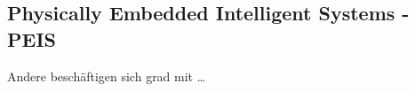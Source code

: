 \subsection{Physically Embedded Intelligent Systems - PEIS}
\label{sec:relatedwork-peis}
    
    Andere beschäftigen sich grad mit \ldots


